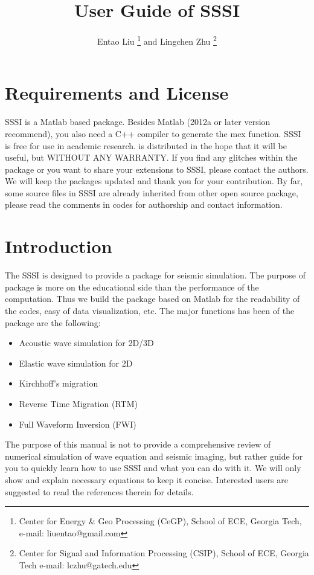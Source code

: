 \documentclass[12pt]{article}
\theoremstyle{plain}
\theoremstyle{definition}
\theoremstyle{remark}
\numberwithin{equation}{section}
\begin{document}
\title{User Guide of SSSI}
\author{Entao Liu \thanks{Center for Energy \& Geo Processing (CeGP), School of ECE, Georgia Tech, e-mail: liuentao@gmail.com}
and Lingchen Zhu \thanks{Center for Signal and Information Processing (CSIP), School of ECE, Georgia Tech 
e-mail: lczhu@gatech.edu}} \maketitle

\section{Requirements and License}

SSSI is a Matlab based package. Besides Matlab (2012a or later version recommend), you also need a C++ compiler to generate the mex function. 
SSSI is free for use in academic research. is distributed in the hope that it will be useful, but WITHOUT ANY
WARRANTY. If you find any glitches within the package or you want to share your extensions to SSSI, please contact the authors. We will keep the packages updated and thank you for your contribution. By far, some source files in SSSI are already inherited from other open source package, please read the comments in codes for authorship and contact information. 

\section{Introduction}
The SSSI is designed to provide a package for seismic simulation. The purpose of package is more on the educational side than the performance of the computation. Thus we build the package based on Matlab for the readability of the codes, easy of data visualization, etc. The major functions has been of the package are the following:
\begin{itemize}
\item Acoustic wave simulation for 2D/3D
\item Elastic wave simulation for 2D
\item Kirchhoff's migration
\item Reverse Time Migration (RTM)
\item Full Waveform Inversion (FWI)
\end{itemize}
The purpose of this manual is not to provide a comprehensive review of numerical simulation of wave equation and seismic imaging, but rather guide for you to quickly learn how to use SSSI and what you can do with it. We will only show and explain necessary equations to keep it concise.
Interested users are suggested to read the references therein for details.  
\end{document}
